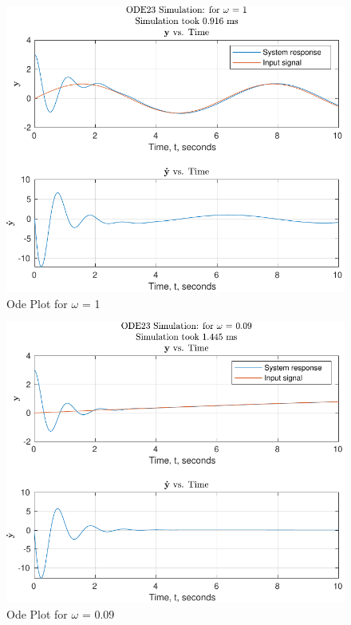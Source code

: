 \documentclass[12pt]{article}
\begin{document}
		
			
		\begin{figure}[H]
			\centering
			\includegraphics[width=1\linewidth]{Code/Fig/ode_sin_input_1}
			\caption{Ode Plot for $\omega$ = 1}
			\label{fig:odesininput1}
		\end{figure}
		\begin{figure}[H]
			\centering
			\includegraphics[width=1\linewidth]{Code/Fig/ode_sin_input_0.09}
			\caption{Ode Plot for $\omega$ = 0.09}
			\label{fig:odesininput009}
		\end{figure}
\end{document}
